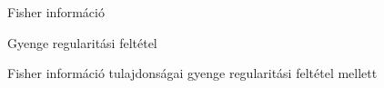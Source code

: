 \documentclass[aspectratio=169,notheorems,9pt,\option]{beamer}
\begin{document}
  \begin{frame}{Fisher információ}
    
  \end{frame}

  \begin{frame}{Gyenge regularitási feltétel}
    
  \end{frame}

  \begin{frame}{Fisher információ tulajdonságai gyenge regularitási feltétel mellett}
    
  \end{frame}
  
  \begin{frame}
  
  \end{frame}

  
\end{document}
